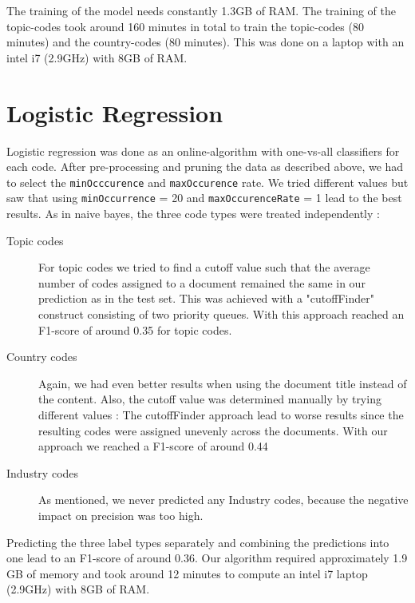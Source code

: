 \documentclass{article}
\begin{document}
The training of the model needs constantly 1.3GB of RAM. The training of the topic-codes took around 160 minutes in total to train the topic-codes (80 minutes) and the country-codes (80 minutes). This was done on a laptop with an intel i7 (2.9GHz) with 8GB of RAM.


\vspace{-2mm}
\section*{Logistic Regression}
    Logistic regression was done as an online-algorithm with one-vs-all classifiers for each code. After pre-processing and pruning the data as described above, we had to select the \texttt{minOcccurence} and \texttt{maxOccurence} rate. We tried different values but saw that using \texttt{minOccurrence} = 20 and \texttt{maxOccurenceRate} = 1 lead to the best results.
    As in naive bayes, the three code types were treated independently :
    \begin{description}
    \item[Topic codes] For topic codes we tried to find a cutoff value such that the average number of codes assigned to a document remained the same in our prediction as in the test set. This was achieved with a "cutoffFinder" construct consisting of two priority queues. With this approach reached an F1-score of around 0.35 for topic codes.
    \item[Country codes] Again,  we had even better results when using the document title instead of the content. Also, the cutoff value was determined manually by trying different values : The cutoffFinder approach lead to worse results since the resulting codes were assigned unevenly across the documents. With our approach we reached a F1-score of around 0.44
    \item[Industry codes] As mentioned, we never predicted any Industry codes, because the negative impact on precision was too high.
    \end{description}

    Predicting the three label types separately and combining the predictions into one lead to an F1-score of around 0.36. Our algorithm required approximately 1.9 GB of memory and took around 12 minutes to compute an intel i7 laptop (2.9GHz) with 8GB of RAM.

\vspace{-2mm}
\end{document}
